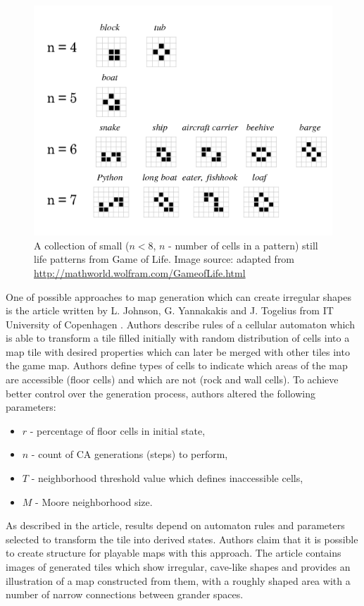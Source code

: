 \documentclass[12pt]{report}
\begin{document}
\begin{figure}[H]
	\centering
	\includegraphics[width=0.6\linewidth]{images/stilllife}
	\caption{A collection of small ($n<8$, $n$ - number of cells in a pattern) still life patterns from Game of Life. Image source: adapted from \url{http://mathworld.wolfram.com/GameofLife.html}}
	\label{fig:stilllife}
\end{figure}


One of possible approaches to map generation which can create irregular shapes is the article written by L. Johnson, G. Yannakakis and J. Togelius from IT University of Copenhagen \autocite{johnson2010cellular}. Authors describe rules of a cellular automaton which is able to transform a tile filled initially with random distribution of cells into a map tile with desired properties which can later be merged with other tiles into the game map. Authors define types of cells to indicate which areas of the map are accessible (floor cells) and which are not (rock and wall cells). To achieve better control over the generation process, authors altered the following parameters: 

\begin{itemize}
	\item $r$ - percentage of floor cells in initial state,
	\item $n$ - count of CA generations (steps) to perform,
	\item $T$ - neighborhood threshold value which defines inaccessible cells, 
	\item $M$ - Moore neighborhood size.
\end{itemize}

As described in the article, results depend on automaton rules and parameters selected to transform the tile into derived states. Authors claim that it is possible to create structure for playable maps with this approach. The article contains images of generated tiles which show irregular, cave-like shapes and provides an illustration of a map constructed from them, with a roughly shaped area with a number of narrow connections between grander spaces. 
\end{document}
